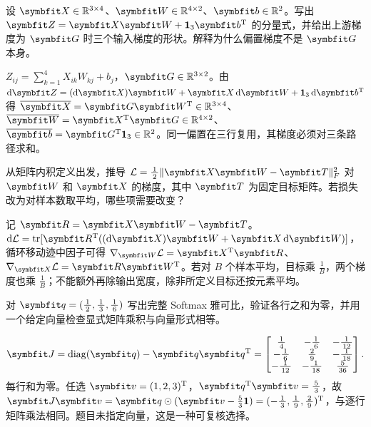 
\begin{exercises}
\begin{exercise} 设 $\mat{X}\in\Real^{3\times4}$、$\mat{W}\in\Real^{4\times2}$、$\vect{b}\in\Real^2$。写出 $\mat{Z}=\mat{X}\mat{W}+\mathbf1_3\vect{b}^{\mathrm{T}}$ 的分量式，并给出上游梯度为 $\mat{G}$ 时三个输入梯度的形状。解释为什么偏置梯度不是 $\mat{G}$ 本身。

\begin{solution}
$Z_{ij}=\sum_{k=1}^4X_{ik}W_{kj}+b_j$，$\mat{G}\in\Real^{3\times2}$。由 $\dif \mat{Z}=(\dif \mat{X})\mat{W}+\mat{X}\dif \mat{W}+\mathbf1_3\dif \vect{b}^{\mathrm{T}}$ 得 $\overline{\mat{X}}=\mat{G}\mat{W}^{\mathrm{T}}\in\Real^{3\times4}$、$\overline{\mat{W}}=\mat{X}^{\mathrm{T}}\mat{G}\in\Real^{4\times2}$、$\overline{\vect{b}}=\mat{G}^{\mathrm{T}}\mathbf1_3\in\Real^2$。同一偏置在三行复用，其梯度必须对三条路径求和。
\end{solution}
\end{exercise}

\begin{exercise}\optional 从矩阵内积定义出发，推导 $\mathcal L=\frac12\|\mat{X}\mat{W}-\mat{T}\|_F^2$ 对 $\mat{W}$ 和 $\mat{X}$ 的梯度，其中 $\mat{T}$ 为固定目标矩阵。若损失改为对样本数取平均，哪些项需要改变？

\begin{solution}
记 $\mat{R}=\mat{X}\mat{W}-\mat{T}$。$\dif\mathcal L=\operatorname{tr}[\mat{R}^{\mathrm{T}}((\dif \mat{X})\mat{W}+\mat{X}\dif \mat{W})]$，循环移动迹中因子可得 $\nabla_{\mat{W}}\mathcal L=\mat{X}^{\mathrm{T}}\mat{R}$、$\nabla_{\mat{X}}\mathcal L=\mat{R}\mat{W}^{\mathrm{T}}$。若对 $B$ 个样本平均，目标乘 $\frac{1}{B}$，两个梯度也乘 $\frac{1}{B}$；不能额外再除输出宽度，除非所定义目标还按元素平均。
\end{solution}
\end{exercise}

\begin{exercise} 对 $\vect{q}=(\frac{1}{2},\frac{1}{3},\frac{1}{6})$ 写出完整 Softmax 雅可比，验证各行之和为零，并用一个给定向量检查显式矩阵乘积与向量形式相等。

\begin{solution}
\[
\mat{J}=\operatorname{diag}(\vect{q})-\vect{q}\vect{q}^{\mathrm{T}}
=\begin{bmatrix}\frac{1}{4}&-\frac{1}{6}&-\frac{1}{12}\\-\frac{1}{6}&\frac{2}{9}&-\frac{1}{18}\\-\frac{1}{12}&-\frac{1}{18}&\frac{5}{36}\end{bmatrix}.
\]
每行和为零。任选 $\vect{v}=(1,2,3)^{\mathrm{T}}$，$\vect{q}^{\mathrm{T}}\vect{v}=\frac{5}{3}$，故 $\mat{J}\vect{v}=\vect{q}\odot(\vect{v}-\tfrac53\mathbf1)=(-\frac{1}{3},\frac{1}{9},\frac{2}{9})^{\mathrm{T}}$，与逐行矩阵乘法相同。题目未指定向量，这是一种可复核选择。
\end{solution}
\end{exercise}


\end{exercises}
